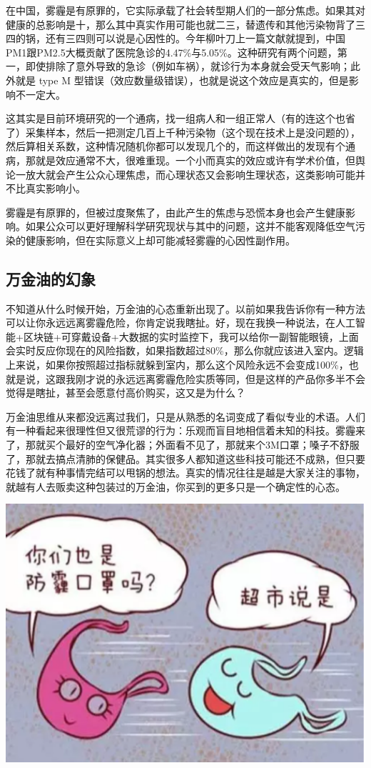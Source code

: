 \documentclass[]{book}
\begin{document}
在中国，雾霾是有原罪的，它实际承载了社会转型期人们的一部分焦虑。如果其对健康的总影响是十，那么其中真实作用可能也就二三，替遗传和其他污染物背了三四的锅，还有三四则可以说是心因性的。今年柳叶刀上一篇文献就提到，中国PM1跟PM2.5大概贡献了医院急诊的4.47\%与5.05\%。这种研究有两个问题，第一，即使排除了意外导致的急诊（例如车祸），就诊行为本身就会受天气影响；此外就是
type M
型错误（效应数量级错误），也就是说这个效应是真实的，但是影响不一定大。

这其实是目前环境研究的一个通病，找一组病人和一组正常人（有的连这个也省了）采集样本，然后一把测定几百上千种污染物（这个现在技术上是没问题的），然后算相关系数，这种情况随机你都可以发现几个的，而这样做出的发现有个通病，那就是效应通常不大，很难重现。一个小而真实的效应或许有学术价值，但舆论一放大就会产生公众心理焦虑，而心理状态又会影响生理状态，这类影响可能并不比真实影响小。

雾霾是有原罪的，但被过度聚焦了，由此产生的焦虑与恐慌本身也会产生健康影响。如果公众可以更好理解科学研究现状与其中的问题，这并不能客观降低空气污染的健康影响，但在实际意义上却可能减轻雾霾的心因性副作用。

\subsection{万金油的幻象}

不知道从什么时候开始，万金油的心态重新出现了。以前如果我告诉你有一种方法可以让你永远远离雾霾危险，你肯定说我瞎扯。好，现在我换一种说法，在人工智能+区块链+可穿戴设备+大数据的实时监控下，我可以给你一副智能眼镜，上面会实时反应你现在的风险指数，如果指数超过80\%，那么你就应该进入室内。逻辑上来说，如果你按照超过指标就躲到室内，那么这个风险永远不会变成100\%，也就是说，这跟我刚才说的永远远离雾霾危险实质等同，但是这样的产品你多半不会觉得是瞎扯，甚至会愿意付高价购买，这又是为什么？

万金油思维从来都没远离过我们，只是从熟悉的名词变成了看似专业的术语。人们有一种看起来很理性但又很荒谬的行为：乐观而盲目地相信着未知的科技。雾霾来了，那就买个最好的空气净化器；外面看不见了，那就来个3M口罩；嗓子不舒服了，那就去搞点清肺的保健品。其实很多人都知道这些科技可能还不成熟，但只要花钱了就有种事情完结可以甩锅的想法。真实的情况往往是越是大家关注的事物，就越有人去贩卖这种包装过的万金油，你买到的更多只是一个确定性的心态。

\includegraphics[width=6.67in]{images/cw4}
\end{document}
